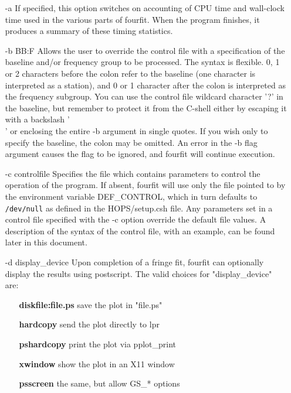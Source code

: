 \begin{itemize}
\item [-a]
If specified, this option switches on accounting
of CPU time and wall-clock time used in the various
parts of fourfit.  When the program finishes, it
produces a summary of these timing statistics.
\item [-b BB:F]
Allows the user to override the control file
with a specification of the baseline and/or
frequency group to be processed.  The syntax is
flexible.  0, 1 or 2 characters before the colon
refer to the baseline (one character is interpreted
as a station), and 0 or 1 character after the colon
is interpreted as the frequency subgroup.  You can
use the control file wildcard character '?' in
the baseline, but remember to protect it from the
C-shell either by escaping it with a backslash '\\'
or enclosing the entire -b argument in single
quotes.  If you wish only to specify the baseline,
the colon may be omitted.  An error in the -b
flag argument causes the flag to be ignored, and
fourfit will continue execution.
\item[-c controlfile]
            Specifies the file which contains parameters
            to control the operation of the program.  If
            absent, fourfit will use only the file pointed to
            by the environment variable DEF\_CONTROL, which
            in turn defaults to \texttt{/dev/null} as defined
            in the HOPS/setup.csh file.  Any parameters
            set in a control file specified with the -c option
            override the default file values.  A description
            of the syntax of the control file, with an example,
            can be found later in this document.

\item[-d display\_device]
            Upon completion of a fringe fit, fourfit can
            optionally display the results using postscript.
            The valid choices for "display\_device" are:
                \begin{itemize}
                \item[]\textbf{diskfile:file.ps} save the plot in "file.ps"
                \item[]\textbf{hardcopy}         send the plot directly to lpr
                \item[]\textbf{pshardcopy}       print the plot via pplot\_print
                \item[]\textbf{xwindow}          show the plot in an X11 window
                \item[]\textbf{psscreen}         the same, but allow GS\_* options
                \end{itemize}


\end{itemize}
